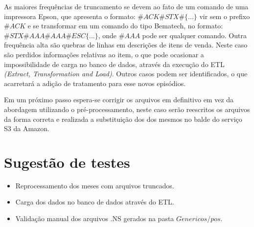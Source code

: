 \documentclass{article}      %
\begin{document}
As maiores frequências de truncamento se devem ao fato de um comando de uma impressora Epson, que apresenta o formato: $\#ACK\#STX\#\{...\}$ vir sem o prefixo $\#ACK$ e se transformar em um comando do tipo Bematech, no formato: $\#STX\#AAA\#AAA\#ESC\{...\}$, onde $\#AAA$ pode ser qualquer comando. Outra frequência alta são quebras de linhas em descrições de itens de venda. Neste caso são perdidos informações relativas ao item, o que pode ocasionar a impossibilidade de carga no banco de dados, através da execução do ETL \emph{(Extract, Transformation and Load)}. Outros casos podem ser identificados, o que acarretará a adição de tratamento para esse novos episódios.  

Em um próximo passo espera-se corrigir os arquivos em definitivo em vez da abordagem utilizando o pré-processamento, neste caso serão reescritos os arquivos da forma correta e realizada a substituição dos dos mesmos no balde do serviço S3 da Amazon. 


\section{Sugestão de testes}

\begin{itemize}
    \item Reprocessamento dos meses com arquivos truncados. 
    \item Carga dos dados no banco de dados através do ETL.
    \item Validação manual dos arquivos .NS gerados na pasta $Genericos/pos$.
\end{itemize}



\end{document}

